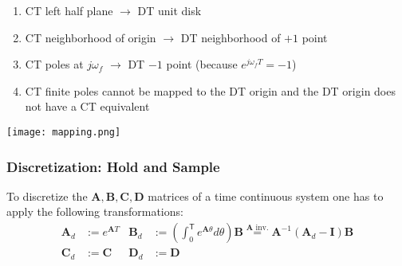 \begin{enumerate}
    \item CT left half plane $\rightarrow$ DT unit disk
    \item CT neighborhood of origin $\rightarrow$ DT neighborhood of $+1$ point
    \item CT poles at $j\omega_f$ $\rightarrow$ DT $-1$ point (because $e^{j\omega_{f}T}=-1$)
    \item CT finite poles cannot be mapped to the DT origin and the DT origin does not have a CT equivalent
\end{enumerate}

\begin{center}
    \texttt{[image: mapping.png]}
\end{center}


\subsubsection{Discretization: Hold and Sample}\label{disc::hold_and_sample}

To discretize the $\mathbf{A}, \mathbf{B}, \mathbf{C}, \mathbf{D}$ matrices of a time continuous system one has to apply the following transformations:
\begin{align*}
    \mathbf{A}_d & :=e^{\mathbf{A}T} & \mathbf{B}_d & :=\left(\int_0^{\mathsf{T}} {e^{\mathbf{A}\theta}}d\theta\right)\mathbf{B} \overset{\mathbf{A} \text{ inv.}}{=} \mathbf{A}^{-1}\left(\mathbf{A}_d-\mathbf{I}\right)\mathbf{B} \\
    \mathbf{C}_d & :=\mathbf{C}      & \mathbf{D}_d & :=\mathbf{D}
\end{align*}

\newpar{}

